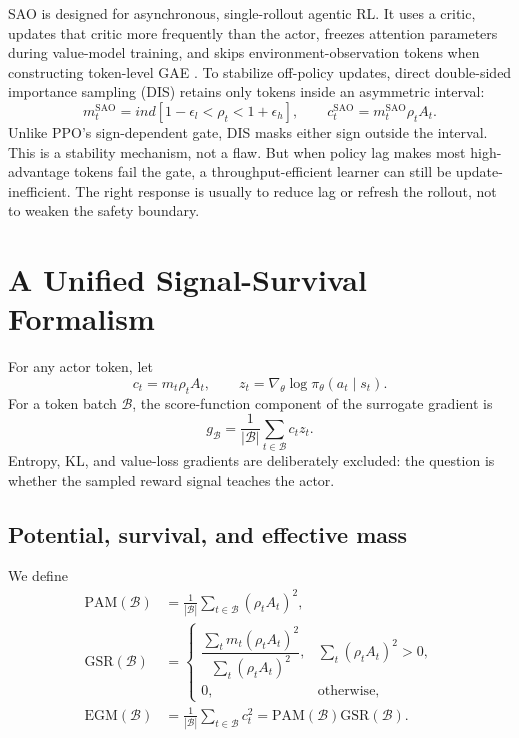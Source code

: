 \documentclass{article}
\newcommand{\egm}{\mathrm{EGM}}
\newcommand{\pam}{\mathrm{PAM}}
\newcommand{\gsr}{\mathrm{GSR}}
\begin{document}
SAO is designed for asynchronous, single-rollout agentic RL.  It uses a
critic, updates that critic more frequently than the actor, freezes attention
parameters during value-model training, and skips environment-observation
tokens when constructing token-level GAE \citep{hou2026sao}.  To stabilize
off-policy updates, direct double-sided importance sampling (DIS) retains only
tokens inside an asymmetric interval:
\begin{equation}
  m_t^{\mathrm{SAO}}=ind\!\left[1-\epsilon_l < \rho_t < 1+\epsilon_h\right],
  \qquad
  c_t^{\mathrm{SAO}}=m_t^{\mathrm{SAO}}\rho_t A_t.
  \label{eq:sao-gate}
\end{equation}
Unlike PPO's sign-dependent gate, DIS masks either sign outside the interval.
This is a stability mechanism, not a flaw.  But when policy lag makes most
high-advantage tokens fail the gate, a throughput-efficient learner can still
be update-inefficient.  The right response is usually to reduce lag or refresh
the rollout, not to weaken the safety boundary.

\section{A Unified Signal-Survival Formalism}
\label{sec:formalism}

For any actor token, let
\begin{equation}
  c_t=m_t\rho_t A_t,
  \qquad
  z_t=\nabla_\theta\log\pi_\theta(a_t\mid s_t).
  \label{eq:coefficient}
\end{equation}
For a token batch $\mathcal{B}$, the score-function component of the surrogate
gradient is
\begin{equation}
  g_{\mathcal{B}}=\frac{1}{|\mathcal{B}|}
  \sum_{t\in\mathcal{B}}c_t z_t.
  \label{eq:gradient}
\end{equation}
Entropy, KL, and value-loss gradients are deliberately excluded: the question
is whether the sampled reward signal teaches the actor.

\subsection{Potential, survival, and effective mass}

We define
\begin{align}
  \pam(\mathcal{B})
    &=\frac{1}{|\mathcal{B}|}\sum_{t\in\mathcal{B}}(\rho_t A_t)^2,
    \label{eq:pam}\\
  \gsr(\mathcal{B})
    &=\begin{cases}
       \dfrac{\sum_t m_t(\rho_t A_t)^2}
             {\sum_t(\rho_t A_t)^2}, & \sum_t(\rho_t A_t)^2>0,\\[7pt]
       0, & \text{otherwise,}
      \end{cases}
    \label{eq:gsr}\\
  \egm(\mathcal{B})
    &=\frac{1}{|\mathcal{B}|}\sum_{t\in\mathcal{B}}c_t^2
      =\pam(\mathcal{B})\gsr(\mathcal{B}).
    \label{eq:egm}
\end{align}
\end{document}
